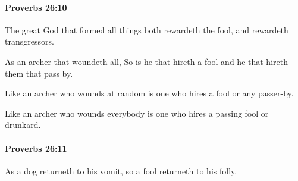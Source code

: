		\paragraph{Proverbs 26:10} %
			\label{PROVERBS-26-10}

			The great God that formed all things both rewardeth the fool, and rewardeth transgressors.

			\begin{versebox}
					\item[BHS] 
					\item[ASV] As an archer that woundeth all, So is he that hireth a fool and he that hireth them that pass by.
					\item[NIV] Like an archer who wounds at random is one who hires a fool or any passer-by.
					\item[NRSV] Like an archer who wounds everybody is one who hires a passing fool or drunkard.
			\end{versebox}

		\paragraph{Proverbs 26:11} %
			\label{PROVERBS-26-11}

			As a dog returneth to his vomit, so a fool returneth to his folly.

